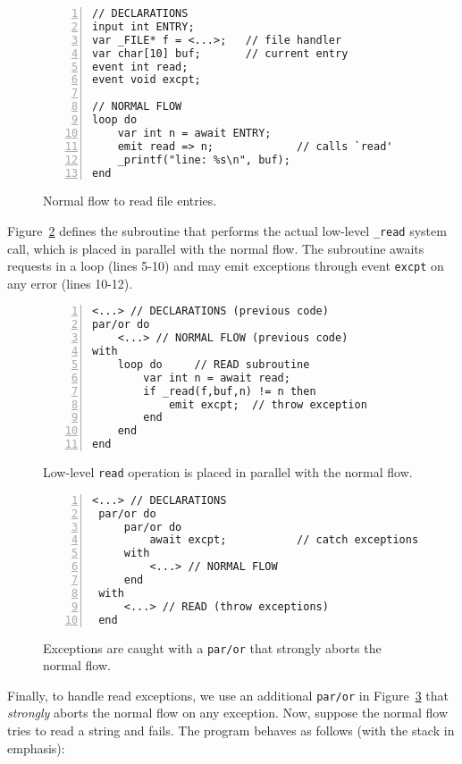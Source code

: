 \documentclass{acm_proc_article-sp}
\newcommand{\code}[1] {{\small{\texttt{#1}}}}
\newcommand{\1}{\;}
\newcommand{\2}{\;\;}
\newcommand{\3}{\;\;\;}
\newcommand{\5}{\;\;\;\;\;}
\begin{document}
\begin{figure}[t]
\begin{lstlisting}[numbers=left,xleftmargin=2em]
// DECLARATIONS
input int ENTRY;
var _FILE* f = <...>;   // file handler
var char[10] buf;       // current entry
event int read;
event void excpt;

// NORMAL FLOW
loop do
    var int n = await ENTRY;
    emit read => n;             // calls `read'
    _printf("line: %s\n", buf);
end
\end{lstlisting}
\caption{ Normal flow to read file entries.
\label{lst.excpt1}
}
\end{figure}

Figure~\ref{lst.excpt2} defines the subroutine that performs the actual 
low-level \code{\_read} system call, which is placed in parallel with the 
normal flow.
The subroutine awaits requests in a loop (lines 5-10) and may emit
exceptions through event \code{excpt} on any error (lines 10-12).

\begin{figure}[t]
\begin{lstlisting}[numbers=left,xleftmargin=2em]
<...> // DECLARATIONS (previous code)
par/or do
    <...> // NORMAL FLOW (previous code)
with
    loop do     // READ subroutine
        var int n = await read;
        if _read(f,buf,n) != n then
            emit excpt;  // throw exception
        end
    end
end
\end{lstlisting}
\caption{ Low-level \code{read} operation is placed in parallel with the normal 
flow.
\label{lst.excpt2}
}
\end{figure}

\begin{figure}[t]
\begin{lstlisting}[numbers=left,xleftmargin=2em]
 <...> // DECLARATIONS
 par/or do
     par/or do
         await excpt;           // catch exceptions
     with
         <...> // NORMAL FLOW
     end
 with
     <...> // READ (throw exceptions)
 end
\end{lstlisting}
\caption{ Exceptions are caught with a \code{par/or} that strongly aborts the 
normal flow.
\label{lst.excpt3}
}
\end{figure}

Finally, to handle read exceptions, we use an additional \code{par/or} in 
Figure~\ref{lst.excpt3} that \emph{strongly} aborts the normal flow on any 
exception.
Now, suppose the normal flow tries to read a string and fails.
The program behaves as follows (with the stack in emphasis):
\end{document}
